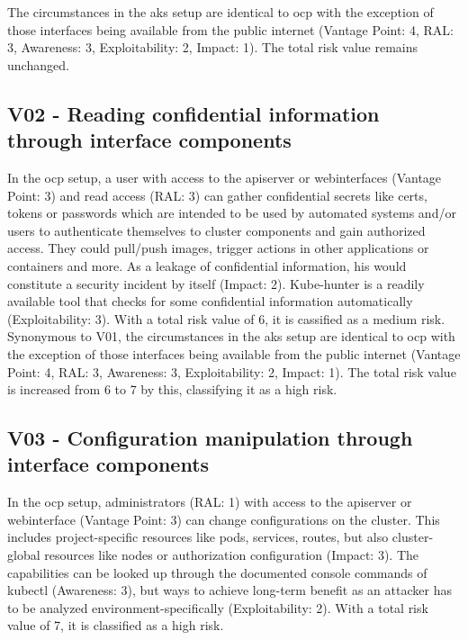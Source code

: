 The circumstances in the \gls{aks} setup are identical to \gls{ocp} with the exception of those interfaces being available from the public internet (Vantage Point: 4, RAL: 3, Awareness: 3, Exploitability: 2, Impact: 1). The total risk value remains unchanged.

\subsection{V02 - Reading confidential information through interface components}

In the \gls{ocp} setup, a user with access to the apiserver or webinterfaces (Vantage Point: 3) and read access (RAL: 3) can gather confidential secrets like certs, tokens or passwords which are intended to be used by automated systems and/or users to authenticate themselves to cluster components and gain authorized access. They could pull/push images, trigger actions in other applications or containers and more. As a leakage of confidential information, his would constitute a security incident by itself (Impact: 2). 
Kube-hunter is a readily available tool that checks for some confidential information automatically (Exploitability: 3).
With a total risk value of 6, it is cassified as a medium risk. \\


Synonymous to V01, the circumstances in the \gls{aks} setup are identical to \gls{ocp} with the exception of those interfaces being available from the public internet (Vantage Point: 4, RAL: 3, Awareness: 3, Exploitability: 2, Impact: 1). 
The total risk value is increased from 6 to 7 by this, classifying it as a high risk.

\subsection{V03 - Configuration manipulation through interface components}
In the \gls{ocp} setup, administrators (RAL: 1) with access to the apiserver or webinterface (Vantage Point: 3) can change configurations on the cluster. This includes project-specific resources like pods, services, routes, but also cluster-global resources like nodes or authorization configuration (Impact: 3).
The capabilities can be looked up through the documented console commands of kubectl (Awareness: 3), but ways to achieve long-term benefit as an attacker has to be analyzed environment-specifically (Exploitability: 2).
With a total risk value of 7, it is classified as a high risk. \\


